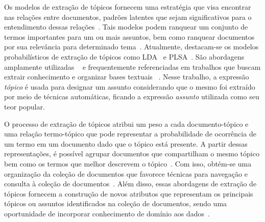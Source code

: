 

Os modelos de extração de tópicos fornecem uma estratégia que visa encontrar nas relações entre documentos, padrões latentes que sejam significativos para o entendimento dessas relações~\cite{Wei2007}. Tais modelos podem ranquear um conjunto de termos importantes para um ou mais assuntos, bem como ranquear documentos por sua relevância para determinado tema~\cite{Faleiros2016,Xing2009}.
Atualmente, destacam-se os modelos probabilísticos de extração de tópicos como LDA~\cite{Blei2003} e PLSA~\cite{Hofmann1999}. São abordagens amplamente utilizadas ~\cite{DZhu20122} e frequentemente referenciadas em trabalhos que buscam extrair conhecimento e organizar bases textuais ~\cite{Aggarwal2018, OCallaghan2015, Steyvers2007}.  
%
%
Nesse trabalho, a expressão \textit{tópico} é usada para designar um assunto considerando que o mesmo foi extraído por meio de técnicas automáticas, ficando a expressão \textit{assunto} utilizada como seu teor popular. 

O processo de extração de tópicos atribui um peso a cada documento-tópico e uma relação termo-tópico que pode representar a probabilidade de ocorrência de um termo em um documento dado que o tópico está presente. A partir dessas representações, é possível agrupar documentos que compartilham o mesmo tópico bem como os termos que melhor descrevem o tópico~\cite{Aggarwal2018}. Com isso, obtém-se uma organização da coleção de documentos que favorece técnicas para navegação e consulta à coleção de documentos~\cite{Maracini2010}. 
% 
Além disso, essas abordagens de extração de tópicos fornecem a construção de novos atributos que representam os principais tópicos ou assuntos identificados na coleção de documentos, sendo uma oportunidade de incorporar conhecimento de domínio aos dados~\cite{Guyon2003}. 



































